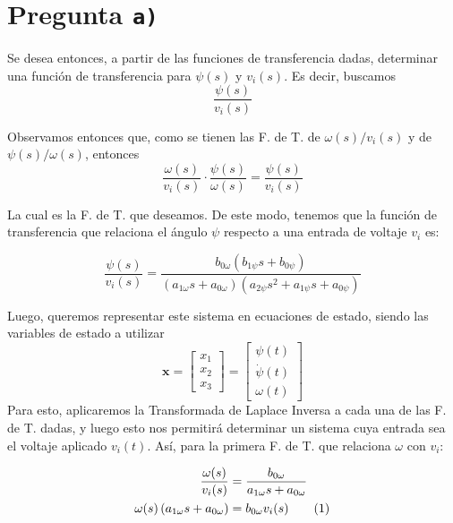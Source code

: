 \section{Pregunta \texttt{a)}}

Se desea entonces, a partir de las funciones de transferencia dadas, determinar
una función de transferencia para $\psi (s)$ y $v_{i} (s)$. Es decir, buscamos
\begin{equation}
  \frac{\psi (s)}{v_{i} (s)}
  \label{eq:fdt-1}
\end{equation}

Observamos entonces que, como se tienen las F. de T. de $\omega (s) / v_{i} (s)$
y de $\psi (s) / \omega (s)$, entonces
\begin{equation}
  \frac{\omega (s)}{v_{i} (s)} \cdot \frac{\psi (s)}{\omega (s)} = \frac{\psi (s)}{v_{i} (s)}
\end{equation}

La cual es la F. de T. que deseamos. De este modo, tenemos que la función de
transferencia que relaciona el ángulo $\psi$ respecto a una entrada de voltaje
$v_{i}$ es:

\begin{equation}
  \frac{\psi (s)}{v_{i} (s)} =
    \frac{b_{0\omega}\left(b_{1\psi}s + b_{0\psi}\right)}
    {\left(a_{1\omega}s + a_{0\omega}\right)\left(a_{2\psi}s^{2} + a_{1\psi}s + a_{0\psi}\right)}
  \label{eq:fdt-2}
\end{equation}

Luego, queremos representar este sistema en ecuaciones de estado, siendo las
variables de estado a utilizar
\begin{equation}
  \mathbf{x} = \begin{bmatrix}x_{1} \\ x_{2} \\ x_{3}\end{bmatrix}
    = \begin{bmatrix}\psi (t) \\ \dot\psi (t) \\ \omega (t) \end{bmatrix}
  \label{eq:var-estado}
\end{equation}
Para esto, aplicaremos la Transformada de Laplace Inversa a cada una de las
F. de T. dadas, y luego esto nos permitirá determinar un sistema cuya entrada
sea el voltaje aplicado $v_{i} (t)$. Así, para la primera F. de T. que relaciona
$\omega$ con $v_{i}$:

\begin{align}
  \frac{\omega (s)}{v_{i} (s)} &= \frac{b_{0\omega}}{a_{1\omega}s + a_{0\omega}} \\
  \omega (s) \left(a_{1\omega}s + a_{0\omega}\right) &= b_{0\omega}v_{i} (s)
    \stepcounter{equation}\tag{\theequation}\label{eq:fdt-3}
\end{align}

